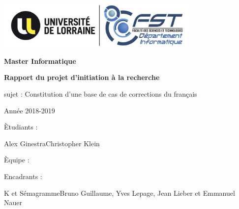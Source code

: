 \documentclass[11pt]{article}
\begin{document}
\begin{center}
\includegraphics[width=10cm]{logoULFST.jpg} %
\end{center}

\begin{center}
\thispagestyle{empty}
{\bfseries \large Master Informatique}
\end{center}

\vspace*{70mm}
\begin{center}
	{\bfseries \Huge Rapport du projet d'initiation \`{a} la recherche}
\end{center}
\vspace*{10mm}
\begin{center}
{\large sujet : Constitution d'une base de cas de corrections du fran\c{c}ais}
\end{center}
\begin{center}
{\large Ann\'ee 2018-2019}
\end{center}



\vspace*{60mm}
\begin{multicols}{2}
\begin{multicols}{2}
	\begin{flushright}
		\`{E}tudiants :
	\end{flushright}
		\vfill\null\columnbreak
	\begin{flushleft}
		Alex Ginestra\newline Christopher Klein
	\end{flushleft}
\end{multicols}
\vfill\null\columnbreak
\begin{multicols}{2}
	\begin{flushright}
		\`{E}quipe :
	\end{flushright}
	\begin{flushright}
		Encadrants :
	\end{flushright}
	\vfill\null\columnbreak
	\begin{flushleft}
	K et S\'emagramme\newline Bruno Guillaume, Yves Lepage, Jean Lieber et Emmanuel Nauer
	\end{flushleft}
\end{multicols}
\end{multicols}
\cleardoublepage
\cleardoublepage
\end{document}
